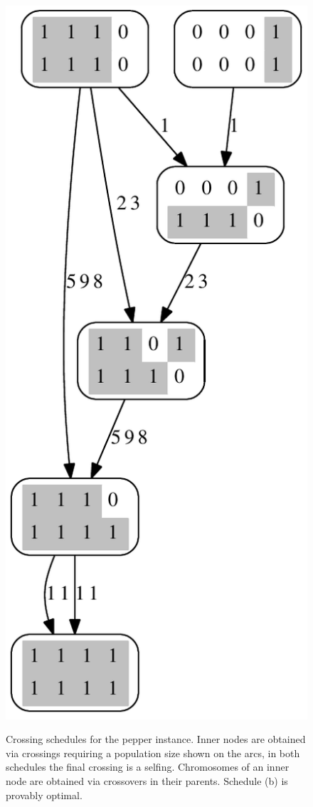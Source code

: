 \documentclass[runningheads]{llncs}
\begin{document}
\begin{figure}
{    \includegraphics[scale=.35]{images/pepper_4_4}
  }
  \caption{Crossing schedules for the pepper instance. Inner nodes are obtained via crossings requiring a population size shown on the arcs, in both schedules the final crossing is a selfing. Chromosomes of an inner node are obtained via crossovers in their parents. Schedule (b) is provably optimal.}
  \label{fig:pepper}
\end{figure}
\end{document}

